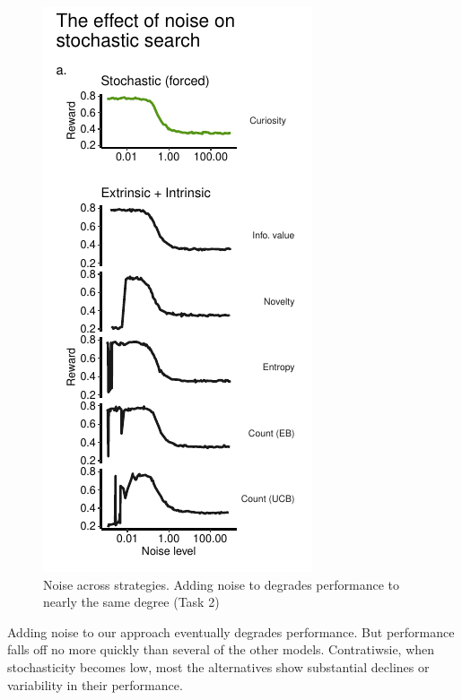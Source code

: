\begin{figure}
	\includegraphics[width=0.4\linewidth]{img/forced2.pdf} 
	\caption{Noise across strategies. Adding noise to degrades performance to nearly the same degree (Task 2)}
	\label{fig:noise}
\end{figure}

Adding noise to our approach eventually degrades performance. But performance  falls off no more quickly than several of the other models. Contratiwsie, when stochasticity becomes low, most the alternatives show substantial declines or variability in their performance. 
